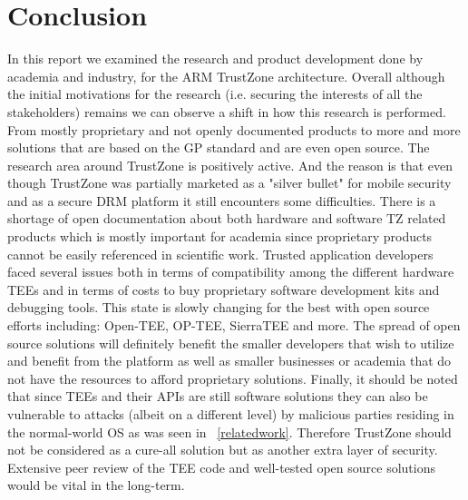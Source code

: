 \documentclass[cameraready]{cseminar}
\begin{document}

\section{Conclusion}
\label{conclusion}

In this report we examined the research and product development done by academia and industry, for the ARM TrustZone architecture. Overall although the initial motivations for the research (i.e. securing the interests of all the stakeholders) remains we can observe a shift in how this research is performed. From mostly proprietary and not openly documented products to more and more solutions that are based on the GP standard and are even open source. The research area around TrustZone is positively active. And the reason is that even though TrustZone was partially marketed as a "silver bullet" for mobile security and as a secure DRM platform it still encounters some difficulties. There is a shortage of open documentation about both hardware and software TZ related products which is mostly important for academia since proprietary products cannot be easily referenced in scientific work. Trusted application developers faced several issues both in terms of compatibility among the different hardware TEEs and in terms of costs to buy proprietary software development kits and debugging tools. This state is slowly changing for the best with open source efforts including: Open-TEE, OP-TEE, SierraTEE and more. The spread of open source solutions will definitely benefit the smaller developers that wish to utilize and benefit from the platform as well as smaller businesses or academia that do not have the resources to afford proprietary solutions.
Finally, it should be noted that since TEEs and their APIs are still software solutions they can also be vulnerable to attacks (albeit on a different level) by malicious parties residing in the normal-world OS as was seen in ~\ref{relatedwork}. Therefore TrustZone should not be considered as a cure-all solution but as another extra layer of security. Extensive peer review of the TEE code and well-tested open source solutions would be vital in the long-term.




\end{document}
